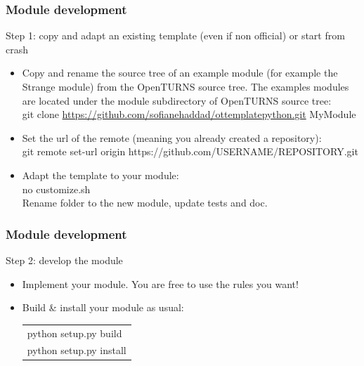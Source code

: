 \documentclass[8pt]{beamer}
\begin{document}
\begin{frame}
  \frametitle{Module development}
  \begin{block}{Step 1: copy and adapt an existing template (even if non official) or start from crash}
    \begin{itemize}
    \item Copy and rename the source tree of an example module (for example the Strange module) from the OpenTURNS source tree. The examples modules are located under the module subdirectory of OpenTURNS source tree:\\
      {\ttfamily git clone \href{https://github.com/sofianehaddad/ottemplatepython.git}{https://github.com/sofianehaddad/ottemplatepython.git} MyModule}
    \item Set the url of the remote (meaning you already created a repository):\\
      {\ttfamily git remote set-url origin https://github.com/USERNAME/REPOSITORY.git}
    \item Adapt the template to your module:\\
      {\ttfamily no customize.sh }\\
      Rename folder to the new module, update tests and doc.
    \end{itemize}
  \end{block}
\end{frame}

\begin{frame}
  \frametitle{Module development}
  \begin{block}{Step 2: develop the module}
    \begin{itemize}
    \item Implement your module. You are free to use the rules you want!
    \item Build \& install your module as usual:
      \begin{tabular}{l}
        \ttfamily python setup.py build \\
        \ttfamily python setup.py install
      \end{tabular}
    \end{itemize}
  \end{block}
\end{frame}
\end{document}
